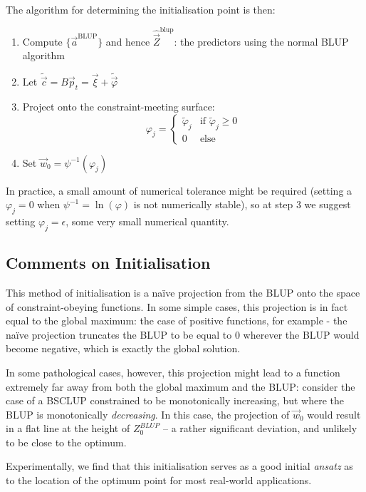 \documentclass[]{article}
\begin{document}
			The algorithm for determining the initialisation point is then:
			\begin{enumerate}
				\item Compute $\{ \vec{a}^\text{BLUP} \}$ and hence $\hat{\vec{Z}}^\text{blup}$: the predictors using the normal BLUP algorithm
				\item Let $\tilde{\vec{c}} = B \vec{p}_t = \vec{\xi} + \tilde{\vec{\varphi}}$
				\item Project onto the constraint-meeting surface:
				$$ \varphi_j = \begin{cases} \tilde{\varphi}_j & \text{if } \tilde{\varphi}_j \geq 0
					\\
					0 & \text{else} \end{cases}$$
				\item Set $\vec{w}_0 = \psi^{-1}\left(\varphi_j\right)$
			\end{enumerate}
			In practice, a small amount of numerical tolerance might be required (setting a $\varphi_j =0$ when $\psi^{-1} = \ln(\varphi)$ is not numerically stable), so at step 3 we suggest setting $\varphi_j = \epsilon$, some very small numerical quantity.

			\subsection{Comments on Initialisation}

				This method of initialisation is a na\"ive projection from the BLUP onto the space of constraint-obeying functions. In some simple cases, this projection is in fact equal to the global maximum: the case of positive functions, for example - the na\"ive projection truncates the BLUP to be equal to 0 wherever the BLUP would become negative, which is exactly the global solution. 
				
				In some pathological cases, however, this projection might lead to a function extremely far away from both the global maximum and the BLUP: consider the case of a BSCLUP constrained to be monotonically increasing, but where the BLUP is monotonically \textit{decreasing}. In this case, the projection of $\vec{w}_0$ would result in a flat line at the height of $Z^{BLUP}_0$ -- a rather significant deviation, and unlikely to be close to the optimum.

				Experimentally, we find that this initialisation serves as a good initial \textit{ansatz} as to the location of the optimum point for most real-world applications.
				
\end{document}
